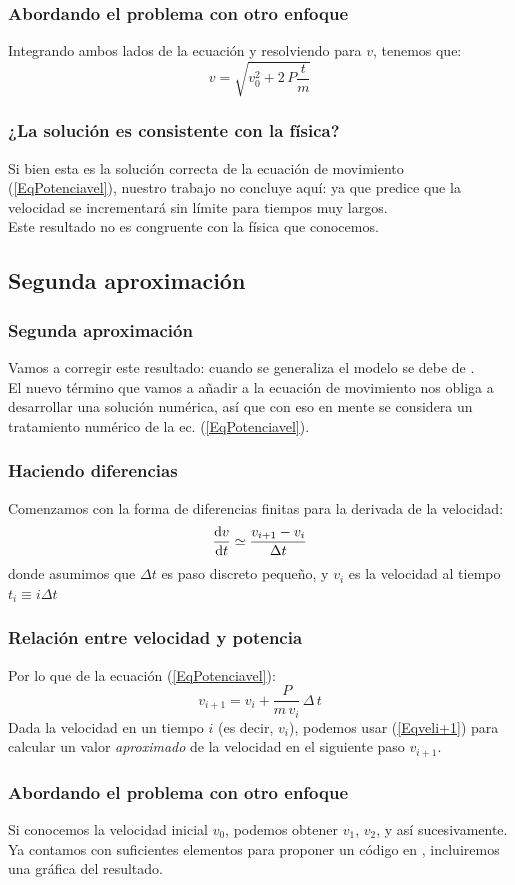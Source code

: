 \documentclass[12pt]{beamer}
\begin{document}
\begin{frame}
\frametitle{Abordando el problema con otro enfoque}
Integrando ambos lados de la ecuación y resolviendo para $v$, tenemos que:
\pause
\begin{equation}\label{Eqvres}
v = \sqrt{v_{0}^{2} + 2 \, P \dfrac{t}{m}}
\end{equation}
\end{frame}
\begin{frame}
\frametitle{¿La solución es consistente con la física?}
Si bien esta es la solución correcta de la ecuación de movimiento (\ref{EqPotenciavel}), nuestro trabajo no concluye aquí: \pause ya que predice que \textcolor{lava}{la velocidad se incrementará sin límite para tiempos muy largos}.
\\
\bigskip
\pause
Este resultado no es congruente con la física que conocemos.
\end{frame}

\subsection{Segunda aproximación}

\begin{frame}
\frametitle{Segunda aproximación}
Vamos a corregir este resultado: cuando se generaliza el modelo se debe de .
\\
\bigskip
\pause
El nuevo término que vamos a añadir a la ecuación de movimiento nos obliga a desarrollar una solución numérica, así que con eso en mente se considera un tratamiento numérico de la ec. (\ref{EqPotenciavel}).
\end{frame}
\begin{frame}
\frametitle{Haciendo diferencias}
Comenzamos con la forma de diferencias finitas para la derivada de la velocidad:
\pause
\begin{equation}
\dv{v}{t} \simeq \dfrac{v_{i + 1} - v_{i}}{\Delta t}
\label{Eqderivada}
\end{equation}
donde asumimos que $\Delta t$ es paso discreto pequeño, y $v_{i}$ es la velocidad al tiempo $t_{i} \equiv i \Delta t$
\end{frame}
\begin{frame}
\frametitle{Relación entre velocidad y potencia}
Por lo que de la ecuación (\ref{EqPotenciavel}):
\pause
\begin{equation}
v_{i + 1} = v_{i} + \dfrac{P}{m \, v_{i}} \, \Delta \, t
\label{Eqveli+1}
\end{equation}
Dada la velocidad en un tiempo $i$ (es decir, $v_{i}$), podemos usar (\ref{Eqveli+1}) para calcular un valor \textit{aproximado} de la velocidad en el siguiente paso $v_{i+1}$.
\end{frame}
\begin{frame}
\frametitle{Abordando el problema con otro enfoque}
Si conocemos la velocidad inicial $v_{0}$, podemos obtener $v_{1}$, $v_{2}$, y así sucesivamente.
\\
\bigskip
\pause
Ya contamos con suficientes elementos para proponer un código en \python{}, incluiremos una gráfica del resultado.
\end{frame}
\end{document}
